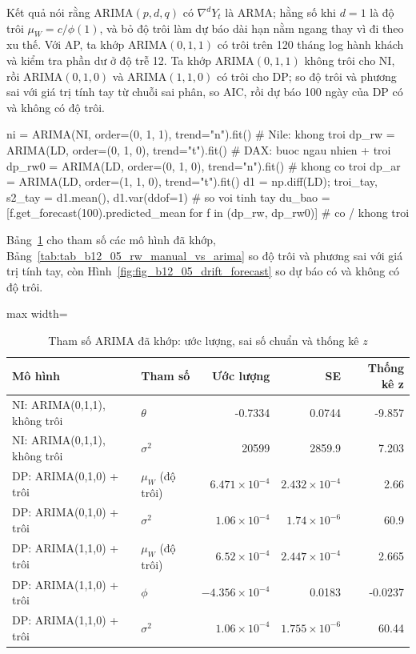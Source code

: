  Kết quả  nói rằng ARIMA$(p,d,q)$ có $\nabla^dY_t$ là ARMA; hằng số khi $d=1$ là độ trôi $\mu_W=c/\phi(1)$, và bỏ độ trôi làm dự báo dài hạn nằm ngang thay vì đi theo xu thế.
 Với AP, ta khớp ARIMA$(0,1,1)$ có trôi trên 120 tháng log hành khách và kiểm tra phần dư ở độ trễ 12. Ta khớp ARIMA$(0,1,1)$ không trôi cho NI, rồi ARIMA$(0,1,0)$ và ARIMA$(1,1,0)$ có trôi cho DP; so độ trôi và phương sai với giá trị tính tay từ chuỗi sai phân, so AIC, rồi dự báo 100 ngày của DP có và không có độ trôi.
\begin{codeblock}
ni = ARIMA(NI, order=(0, 1, 1), trend="n").fit()               # Nile: khong troi
dp_rw = ARIMA(LD, order=(0, 1, 0), trend="t").fit()            # DAX: buoc ngau nhien + troi
dp_rw0 = ARIMA(LD, order=(0, 1, 0), trend="n").fit()           # khong co troi
dp_ar = ARIMA(LD, order=(1, 1, 0), trend="t").fit()
d1 = np.diff(LD); troi_tay, s2_tay = d1.mean(), d1.var(ddof=1) # so voi tinh tay
du_bao = [f.get_forecast(100).predicted_mean for f in (dp_rw, dp_rw0)]   # co / khong troi
\end{codeblock}
 Bảng~\ref{tab:tab_b12_05_arima_params} cho tham số các mô hình đã khớp, Bảng~\ref{tab:tab_b12_05_rw_manual_vs_arima} so độ trôi và phương sai với giá trị tính tay, còn Hình~\ref{fig:fig_b12_05_drift_forecast} so dự báo có và không có độ trôi.
\begin{table}[H]
\centering\footnotesize
\caption{Tham số ARIMA đã khớp: ước lượng, sai số chuẩn và thống kê $z$}\label{tab:tab_b12_05_arima_params}
\begin{adjustbox}{max width=\linewidth}
\begin{tabular}{|l|l|r|r|r|}
\toprule
Mô hình & Tham số & Ước lượng & SE & Thống kê z \\
\midrule
NI: ARIMA(0,1,1), không trôi & $\theta$ & -0.7334 & 0.0744 & -9.857 \\
NI: ARIMA(0,1,1), không trôi & $\sigma^{2}$ & 20599 & 2859.9 & 7.203 \\
DP: ARIMA(0,1,0) + trôi & $\mu_{W}$ (độ trôi) & $6.471\times10^{-4}$ & $2.432\times10^{-4}$ & 2.66 \\
DP: ARIMA(0,1,0) + trôi & $\sigma^{2}$ & $1.06\times10^{-4}$ & $1.74\times10^{-6}$ & 60.9 \\
DP: ARIMA(1,1,0) + trôi & $\mu_{W}$ (độ trôi) & $6.52\times10^{-4}$ & $2.447\times10^{-4}$ & 2.665 \\
DP: ARIMA(1,1,0) + trôi & $\phi$ & $-4.356\times10^{-4}$ & 0.0183 & -0.0237 \\
DP: ARIMA(1,1,0) + trôi & $\sigma^{2}$ & $1.06\times10^{-4}$ & $1.755\times10^{-6}$ & 60.44 \\
\bottomrule
\end{tabular}
\end{adjustbox}
\end{table}
